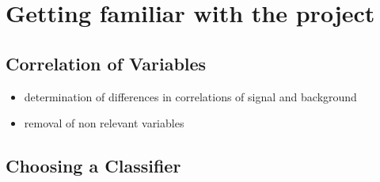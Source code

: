 \section{Getting familiar with the project}
\subsection{Correlation of Variables}
\begin{itemize}
\item determination of differences in correlations of signal and background
\item removal of non relevant variables
\end{itemize}
\subsection{Choosing a Classifier}